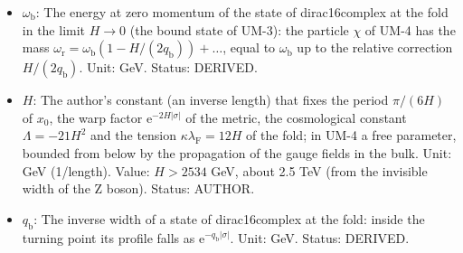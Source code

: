 \documentclass[
  10pt,
]{article}
\begin{document}
\begin{itemize}
  bulk mass \(m_\Psi\);
  \(\upsilon_{\mathrm{b}} = \omega_{\mathrm{b}}/m_\Psi\) that of the
  particle \(\chi\) in the limit \(H/q_{\mathrm{b}} \to 0\),
  \(\upsilon_{\mathrm{r}} = \omega_{\mathrm{r}}/m_\Psi\) that of the
  real part of its resonance. Unit: dimensionless. Status: DERIVED.
\item
  \(\omega_{\mathrm{b}}\): The energy at zero momentum of the state of
  dirac16complex at the fold in the limit \(H \to 0\) (the bound state
  of UM-3): the particle \(\chi\) of UM-4 has the mass
  \(\omega_{\mathrm{r}} = \omega_{\mathrm{b}}(1 - H/(2q_{\mathrm{b}})) + \dots\),
  equal to \(\omega_{\mathrm{b}}\) up to the relative correction
  \(H/(2q_{\mathrm{b}})\). Unit: GeV. Status: DERIVED.
\item
  \(H\): The author's constant (an inverse length) that fixes the period
  \(\pi/(6H)\) of \(x_0\), the warp factor
  \(\mathrm{e}^{-2H\lvert\sigma\rvert}\) of the metric, the cosmological
  constant \(\Lambda = -21H^2\) and the tension
  \(\kappa\lambda_{\mathrm{F}} = 12H\) of the fold; in UM-4 a free
  parameter, bounded from below by the propagation of the gauge fields
  in the bulk. Unit: GeV (1/length). Value: \(H > 2534\) GeV, about 2.5
  TeV (from the invisible width of the Z boson). Status: AUTHOR.
\item
  \(q_{\mathrm{b}}\): The inverse width of a state of dirac16complex at
  the fold: inside the turning point its profile falls as
  \(\mathrm{e}^{-q_{\mathrm{b}}\lvert\sigma\rvert}\). Unit: GeV. Status:
  DERIVED.
\end{itemize}
\end{document}
